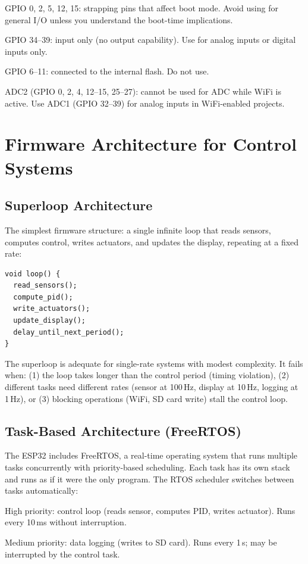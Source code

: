 \documentclass[11pt,letterpaper,twoside,openany]{book}
\begin{document}
GPIO 0, 2, 5, 12, 15: strapping pins that affect boot mode. Avoid using for general I/O unless you understand the boot-time implications.

GPIO 34--39: input only (no output capability). Use for analog inputs or digital inputs only.

GPIO 6--11: connected to the internal flash. Do not use.

ADC2 (GPIO 0, 2, 4, 12--15, 25--27): cannot be used for ADC while WiFi is active. Use ADC1 (GPIO 32--39) for analog inputs in WiFi-enabled projects.

\section{Firmware Architecture for Control Systems}
\subsection{Superloop Architecture}
The simplest firmware structure: a single infinite loop that reads sensors, computes control, writes actuators, and updates the display, repeating at a fixed rate:

\begin{verbatim}
void loop() {
  read_sensors();
  compute_pid();
  write_actuators();
  update_display();
  delay_until_next_period();
}
\end{verbatim}

The superloop is adequate for single-rate systems with modest complexity. It fails when: (1) the loop takes longer than the control period (timing violation), (2) different tasks need different rates (sensor at 100\,Hz, display at 10\,Hz, logging at 1\,Hz), or (3) blocking operations (WiFi, SD card write) stall the control loop.

\subsection{Task-Based Architecture (FreeRTOS)}
The ESP32 includes FreeRTOS, a real-time operating system that runs multiple tasks concurrently with priority-based scheduling. Each task has its own stack and runs as if it were the only program. The RTOS scheduler switches between tasks automatically:

High priority: control loop (reads sensor, computes PID, writes actuator). Runs every 10\,ms without interruption.

Medium priority: data logging (writes to SD card). Runs every 1\,s; may be interrupted by the control task.
\end{document}
